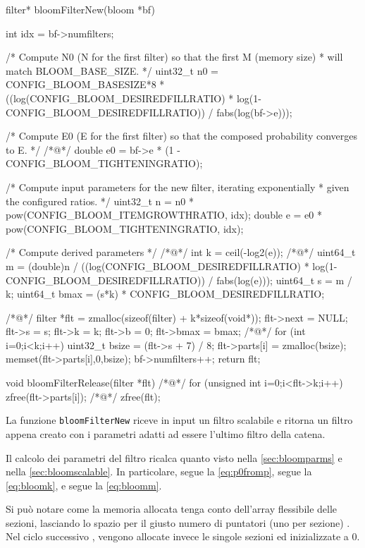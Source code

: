 \begin{commentedsource}[style=csource,caption=Creazione e distruzione di un filtro,label={lst:bloomFilterNew}]
filter* bloomFilterNew(bloom *bf) {
    int idx = bf->numfilters;

    /* Compute N0 (N for the first filter) so that the first M (memory size)
     * will match BLOOM_BASE_SIZE. */
    uint32_t n0 = CONFIG_BLOOM_BASESIZE*8 * ((log(CONFIG_BLOOM_DESIREDFILLRATIO) * log(1-CONFIG_BLOOM_DESIREDFILLRATIO)) / fabs(log(bf->e)));

    /* Compute E0 (E for the first filter) so that the composed probability converges to E. */
/*@\lnote@*/    double e0 = bf->e * (1 - CONFIG_BLOOM_TIGHTENINGRATIO);

    /* Compute input parameters for the new filter, iterating exponentially
     * given the configured ratios. */
    uint32_t n = n0 * pow(CONFIG_BLOOM_ITEMGROWTHRATIO, idx);
    double e = e0 * pow(CONFIG_BLOOM_TIGHTENINGRATIO, idx);

    /* Compute derived parameters */
/*@\lnote@*/    int k = ceil(-log2(e));
/*@\lnote@*/    uint64_t m = (double)n / ((log(CONFIG_BLOOM_DESIREDFILLRATIO) * log(1-CONFIG_BLOOM_DESIREDFILLRATIO)) / fabs(log(e)));
    uint64_t s = m / k;
    uint64_t bmax = (s*k) * CONFIG_BLOOM_DESIREDFILLRATIO;

/*@\lnote@*/    filter *flt = zmalloc(sizeof(filter) + k*sizeof(void*));
    flt->next = NULL;
    flt->s = s;
    flt->k = k;
    flt->b = 0;
    flt->bmax = bmax;
/*@\lnote@*/    for (int i=0;i<k;i++) {
        uint32_t bsize = (flt->s + 7) / 8;
        flt->parts[i] = zmalloc(bsize);
        memset(flt->parts[i],0,bsize);
    }
    bf->numfilters++;
    return flt;
}

void bloomFilterRelease(filter *flt) {
/*@\lnote@*/    for (unsigned int i=0;i<flt->k;i++)
        zfree(flt->parts[i]);
/*@\lnote@*/    zfree(flt);
}
\end{commentedsource}

La funzione \verb|bloomFilterNew| riceve in input un filtro scalabile e ritorna un filtro appena
creato con i parametri adatti ad essere l'ultimo filtro della catena.

Il calcolo dei parametri del filtro ricalca quanto visto nella \autoref{sec:bloomparms} e nella
\autoref{sec:bloomscalable}. In particolare,  segue la \autoref{eq:p0fromp},  
segue la \autoref{eq:bloomk}, e  segue la \autoref{eq:bloomm}.

Si può notare come la memoria allocata tenga conto dell'array flessibile delle sezioni, lasciando lo
spazio per il giusto numero di puntatori (uno per sezione) . Nel ciclo successivo
, vengono allocate invece le singole sezioni ed inizializzate a $0$.

